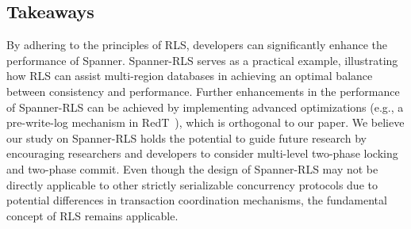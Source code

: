 \subsection{Takeaways}
By adhering to the principles of RLS, developers can significantly enhance the performance of Spanner. Spanner-RLS serves as a practical example, illustrating how RLS can assist multi-region databases in achieving an optimal balance between consistency and performance. Further enhancements in the performance of Spanner-RLS can be achieved by implementing advanced optimizations (e.g., a pre-write-log mechanism in RedT~\cite{zhang2023redt}), which is orthogonal to our paper. We believe our study on Spanner-RLS holds the potential to guide future research by encouraging researchers and developers to consider multi-level two-phase locking and two-phase commit. Even though the design of Spanner-RLS may not be directly applicable to other strictly serializable concurrency protocols due to potential differences in transaction coordination mechanisms, the fundamental concept of RLS remains applicable.

